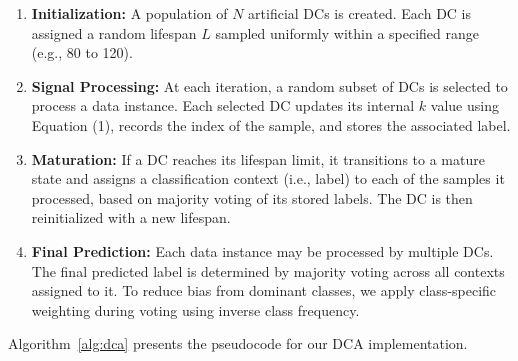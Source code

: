 \documentclass[conference]{IEEEtran}
\begin{document}
\begin{enumerate}
  \item \textbf{Initialization:} A population of $N$ artificial DCs
    is created. Each DC is assigned a random lifespan $L$ sampled
    uniformly within a specified range (e.g., 80 to 120).

  \item \textbf{Signal Processing:} At each iteration, a random
    subset of DCs is selected to process a data instance. Each
    selected DC updates its internal $k$ value using Equation (1),
    records the index of the sample, and stores the associated label.

  \item \textbf{Maturation:} If a DC reaches its lifespan limit, it
    transitions to a mature state and assigns a classification
    context (i.e., label) to each of the samples it processed, based
    on majority voting of its stored labels. The DC is then
    reinitialized with a new lifespan.

  \item \textbf{Final Prediction:} Each data instance may be
    processed by multiple DCs. The final predicted label is
    determined by majority voting across all contexts assigned to it.
    To reduce bias from dominant classes, we apply class-specific
    weighting during voting using inverse class frequency.
\end{enumerate}

Algorithm~\ref{alg:dca} presents the pseudocode for our DCA implementation.
\end{document}
